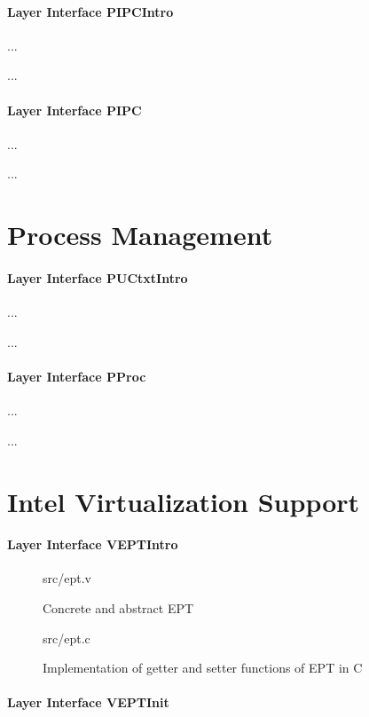 \paragraph{Layer Interface PIPCIntro}
...

...

\paragraph{Layer Interface PIPC}
...

...

\section{Process Management}

\paragraph{Layer Interface PUCtxtIntro}
...

...

\paragraph{Layer Interface PProc}
...

...

\section{Intel Virtualization Support}

\paragraph{Layer Interface VEPTIntro}

\begin{figure}
	 {src/ept.v}
	\caption{Concrete and abstract EPT}
	\label{fig:ept_v}
\end{figure}


\begin{figure}
	 {src/ept.c}
	\caption{Implementation of getter and setter functions of EPT in C}
	\label{fig:ept_c}
\end{figure}

\paragraph{Layer Interface VEPTInit}


